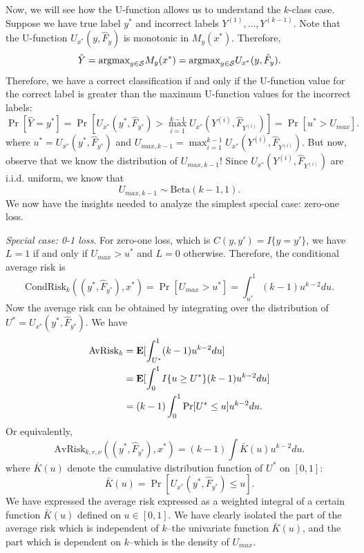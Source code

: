 \documentclass[12pt]{article}
\begin{document}
Now, we will see how the U-function allows us to understand the
$k$-class case.  Suppose we have true label $y^*$ and incorrect labels
$Y^{(1)},\hdots, Y^{(k-1)}$.  Note that the U-function
$U_{x^*}(y, \hat{F}_y)$ is monotonic in $M_y(x^*)$.  Therefore,
\[
\hat{Y} = \text{argmax}_{y \in \mathcal{S}} M_y(x^*) = \text{argmax}_{y \in \mathcal{S}} U_{x^*}(y, \hat{F}_y).
\]
Therefore, we have a correct classification if and only if the U-function value for the correct label
is greater than the maximum U-function values for the incorrect labels:
\[
\Pr[\hat{Y} = y^*] = \Pr[U_{x^*}(y^*, \hat{F}_{y^*}) > \max_{i=1}^{k-1} U_{x^*}(Y^{(i)}, \hat{F}_{Y^{(i)}})] =  \Pr[u^* > U_{max}].
\]
where $u^* = U_{x^*}(y^*, \hat{F}_{y^*})$ and $U_{max, k-1}
= \max_{i=1}^{k-1} U_{x^*}(Y^{(i)}, \hat{F}_{Y^{(i)}})$.  But now,
observe that we know the distribution of $U_{max, k-1}$!  Since
$U_{x^*}(Y^{(i)}, \hat{F}_{Y^{(i)}})$ are i.i.d. uniform, we know that
\begin{equation}\label{eq:umax_beta}
U_{max, k-1} \sim \text{Beta}(k-1, 1). 
\end{equation}
We now have the insights needed to analyze the simplest special case: zero-one loss.
\newline

\noindent \emph{Special case: 0-1 loss}.
For zero-one loss, which is $C(y, y') = I\{y = y'\}$, we have $L=1$ if
and only if $U_{max} > u^*$ and $L=0$ otherwise.  Therefore, the
conditional average risk is
\[
\text{CondRisk}_k((y^*, \hat{F}_{y^*}), x^*) = \Pr[U_{max} > u^*] = \int_{u^*}^1 (k-1) u^{k-2} du.
\]
Now the average risk can be obtained by integrating over the distribution of $U^* = U_{x^*}(y^*, \hat{F}_{y^*})$.
We have
\begin{align*}
\text{AvRisk}_k &= \textbf{E}[ \int_{U^*}^1 (k-1) u^{k-2} du] 
\\&= \textbf{E}[\int_0^1 I\{u \geq U^*\} (k-1) u^{k-2} du ]
\\&= (k-1) \int_0^1 \Pr[U^* \leq u] u^{k-2} du.
\end{align*}
Or equivalently,
\[
\text{AvRisk}_{k, r, \nu}((y^*, \hat{F}_{y^*}), x^*) = (k-1) \int \bar{K}(u) u^{k-2} du.
\]
where $\bar{K}(u)$ denote the cumulative distribution function of $U^*$ on $[0,1]$:
\[
\bar{K}(u) = \Pr[U_{x^*}(y^*, \hat{F}_{y^*}) \leq u].
\]
We have expressed the average risk expressed as a weighted integral of
a certain function $\bar{K}(u)$ defined on $u \in [0,1]$.  We have
clearly isolated the part of the average risk which is independent of
$k$--the univariate function $\bar{K}(u)$, and the part which is
dependent on $k$--which is the density of $U_{max}$.
\end{document}
